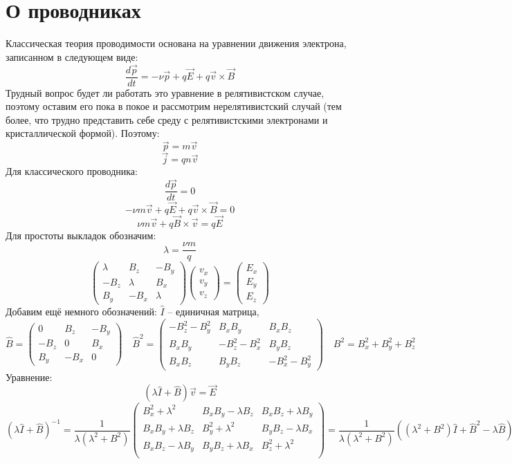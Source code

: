\section{О проводниках}

Классическая теория проводимости основана на уравнении движения электрона, записанном в следующем виде:
\[
	\frac{d\vec{p}}{dt} = - \nu \vec{p} + q\vec{E} + q\vec{v} \times \vec{B}
\]
Трудный вопрос будет ли работать это уравнение в релятивистском случае, поэтому оставим его пока в покое и рассмотрим нерелятивистский случай (тем более, что трудно представить себе среду с релятивистскими электронами и кристаллической формой). Поэтому:
\[
	\vec{p} = m \vec{v}
\]
\[
	\vec{j} = q n \vec{v}
\]
Для классического проводника:
\[
	\frac{d\vec{p}}{dt} = 0
\]
\[
	- \nu m \vec{v} + q \vec{E} + q\vec{v} \times \vec{B} = 0
\]
\[
	\nu m \vec{v} + q \vec{B} \times \vec{v} = q \vec{E} 
\]
Для простоты выкладок обозначим:
\[
	\lambda = \frac{\nu m}{q}
\]
\[
	\begin{pmatrix}
	\lambda & B_z & -B_y \\
	-B_z & \lambda & B_x \\
	B_y & -B_x & \lambda
	\end{pmatrix}
	\begin{pmatrix}
	v_x \\
	v_y \\
	v_z
	\end{pmatrix}
	= 
	\begin{pmatrix}
	E_x \\
	E_y \\
	E_z
	\end{pmatrix}
\]
Добавим ещё немного обозначений: $\hat{I}$ -- единичная матрица,
\[
	\hat{B} = 
	\begin{pmatrix}
	0 & B_z & -B_y \\
	-B_z & 0 & B_x \\
	B_y & -B_x & 0
	\end{pmatrix}
	\quad
	\hat{B}^2 = 
	\begin{pmatrix}
	- B_z^2 - B_y^2	& B_x B_y 			& B_x B_z \\
	B_x B_y 		& - B_z^2 - B_x^2 	& B_y B_z \\
	B_x B_z 		& B_y B_z  			& - B_x^2 - B_y^2
	\end{pmatrix}
	\quad
	B^2 = B_x^2 + B_y^2 + B_z^2
\]
Уравнение:
\[
	(\lambda \hat{I} + \hat{B}) \vec{v} = \vec{E}
\]
\[
	(\lambda \hat{I} + \hat{B})^{-1} = \frac{1}{\lambda(\lambda^2 + B^2)} 
	\begin{pmatrix}
	B_x^2 + \lambda^2   	 & B_x B_y - \lambda B_z 	& B_x B_z + \lambda B_y 	\\
	B_x B_y + \lambda B_z	 & B_y^2 + \lambda^2    	& B_y B_z - \lambda B_x 	\\
	B_x B_z - \lambda B_y	 & B_y B_z + \lambda B_x    & B_z^2 + \lambda^2		 	\\
	\end{pmatrix} =
	\frac{1}{\lambda(\lambda^2 + B^2)}  ((\lambda^2 + B^2) \hat{I} + \hat{B}^2 - \lambda \hat{B})
\]
